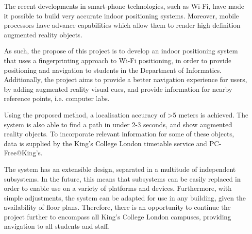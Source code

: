 The recent developments in smart-phone technologies, such as Wi-Fi, have made it possible to build very accurate indoor positioning systems. Moreover, mobile processors have advance capabilities which allow them to render high definition augmented reality objects. 

As such, the propose of this project is to develop an indoor positioning system that uses a fingerprinting approach to Wi-Fi positioning, in order to provide positioning and navigation to students in the Department of Informatics. Additionally, the project aims to provide a better navigation experience for users, by adding augmented reality visual cues, and provide information for nearby reference points, i.e. computer labs.

Using the proposed method, a localisation accuracy of >5 meters is achieved. The system is also able to find a path in under 2-3 seconds, and show augmented reality objects. To incorporate relevant information for some of these objects, data is supplied by the King's College London timetable service and PC-Free@King's. 

The system has an extensible design, separated in a multitude of independent subsystems. In the future, this means that subsystems can be easily replaced in order to enable use on a variety of platforms and devices. Furthermore, with simple adjustments, the system can be adapted for use in any building, given the availability of floor plans. Therefore, there is an opportunity to continue the project further to encompass all King's College London campuses, providing navigation to all students and staff.